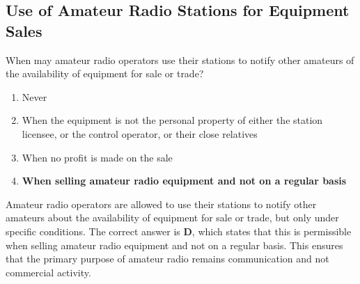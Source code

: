 \subsection{Use of Amateur Radio Stations for Equipment Sales}
\label{T1D05}

\begin{tcolorbox}[colback=gray!10!white,colframe=black!75!black,title=T1D05]
When may amateur radio operators use their stations to notify other amateurs of the availability of equipment for sale or trade?
\begin{enumerate}[label=\Alph*),noitemsep]
    \item Never
    \item When the equipment is not the personal property of either the station licensee, or the control operator, or their close relatives
    \item When no profit is made on the sale
    \item \textbf{When selling amateur radio equipment and not on a regular basis}
\end{enumerate}
\end{tcolorbox}

Amateur radio operators are allowed to use their stations to notify other amateurs about the availability of equipment for sale or trade, but only under specific conditions. The correct answer is \textbf{D}, which states that this is permissible when selling amateur radio equipment and not on a regular basis. This ensures that the primary purpose of amateur radio remains communication and not commercial activity.